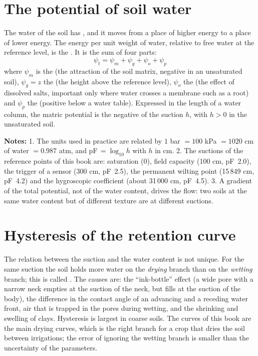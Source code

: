 \section{The potential of soil water}
The water of the soil has , and it moves from a place of higher energy to a place of lower energy. The energy per unit weight of water, relative to free water at the reference level, is the . It is the sum of four parts:
\begin{equation*}\boxed{\psi_t=\psi_m+\psi_g+\psi_o+\psi_p}\end{equation*}
where $\psi_m$ is the  (the attraction of the soil matrix, negative in an unsaturated soil), $\psi_g=z$ the  (the height above the reference level), $\psi_o$ the  (the effect of dissolved salts, important only where water crosses a membrane such as a root) and $\psi_p$ the  (positive below a water table). Expressed in the length of a water column, the matric potential is the negative of the suction $h$, with $h>0$ in the unsaturated soil.

\par\noindent \textbf{Notes:} 1. The units used in practice are related by $1$ bar $=100$ kPa $=1020$ cm of water $=0.987$ atm, and pF$\,=\log_{10}h$ with $h$ in cm. 2. The suctions of the reference points of this book are: saturation (0), field capacity (100 cm, pF~2.0), the trigger of a sensor (300 cm, pF~2.5), the permanent wilting point (15\,849 cm, pF~4.2) and the hygroscopic coefficient (about 31\,000 cm, pF~4.5). 3. A gradient of the total potential, not of the water content, drives the flow: two soils at the same water content but of different texture are at different suctions.

\section{Hysteresis of the retention curve}
The relation between the suction and the water content is not unique. For the same suction the soil holds more water on the \emph{drying} branch than on the \emph{wetting} branch; this is called . The causes are: the ``ink-bottle'' effect (a wide pore with a narrow neck empties at the suction of the neck, but fills at the suction of the body), the difference in the contact angle of an advancing and a receding water front, air that is trapped in the pores during wetting, and the shrinking and swelling of clays. Hysteresis is largest in coarse soils. The curves of this book are the main drying curves, which is the right branch for a crop that dries the soil between irrigations; the error of ignoring the wetting branch is smaller than the uncertainty of the parameters.

